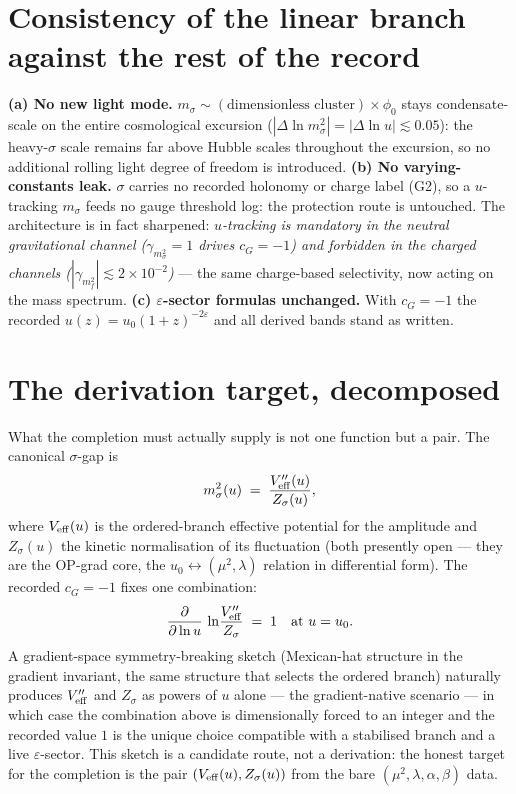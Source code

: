 \documentclass[11pt,a4paper]{article}
\begin{document}
\section{Consistency of the linear branch against the rest of the record}
\textbf{(a) No new light mode.} $m_\sigma\sim(\text{dimensionless
cluster})\times\phi_0$ stays condensate-scale on the entire cosmological
excursion ($|\Delta\ln m_\sigma^2|=|\Delta\ln u|\lesssim0.05$): the
heavy-$\sigma$ scale remains far above Hubble scales throughout the
excursion, so no additional rolling light degree of freedom is introduced.
\textbf{(b) No varying-constants leak.} $\sigma$ carries no recorded
holonomy or charge label (G2), so a $u$-tracking $m_\sigma$ feeds no gauge
threshold log: the protection route is untouched. The architecture is in
fact sharpened: \emph{$u$-tracking is mandatory in the neutral gravitational
channel ($\gamma_{m_\sigma^2}=1$ drives $c_G=-1$) and forbidden in the
charged channels ($|\gamma_{m_f^2}|\lesssim2\times10^{-2}$)} --- the same
charge-based selectivity, now acting on the mass spectrum.
\textbf{(c) $\varepsilon$-sector formulas unchanged.} With $c_G=-1$ the
recorded $u(z)=u_0(1+z)^{-2\varepsilon}$ and all derived bands stand as
written.

\section{The derivation target, decomposed}
What the completion must actually supply is not one function but a pair. The
canonical $\sigma$-gap is
\[
m_\sigma^2(u)\;=\;\frac{V''_{\rm eff}(u)}{Z_\sigma(u)},
\]
where $V_{\rm eff}(u)$ is the ordered-branch effective potential for the
amplitude and $Z_\sigma(u)$ the kinetic normalisation of its fluctuation
(both presently open --- they are the OP-grad core, the
$u_0\!\leftrightarrow\!(\mu^2,\lambda)$ relation in differential form). The
recorded $c_G=-1$ fixes one combination:
\[
\frac{\partial}{\partial\ln u}\,
\ln\!\frac{V''_{\rm eff}}{Z_\sigma}\;=\;1
\quad\text{at }u=u_0.
\]
A gradient-space symmetry-breaking sketch (Mexican-hat structure in the
gradient invariant, the same structure that selects the ordered branch)
naturally produces $V''_{\rm eff}$ and $Z_\sigma$ as powers of $u$ alone ---
the gradient-native scenario --- in which case the combination above is
dimensionally forced to an integer and the recorded value $1$ is the unique
choice compatible with a stabilised branch and a live $\varepsilon$-sector.
This sketch is a candidate route, not a derivation: the honest target for
the completion is the pair $(V_{\rm eff}(u),Z_\sigma(u))$ from the bare
$(\mu^2,\lambda,\alpha,\beta)$ data.
\end{document}
